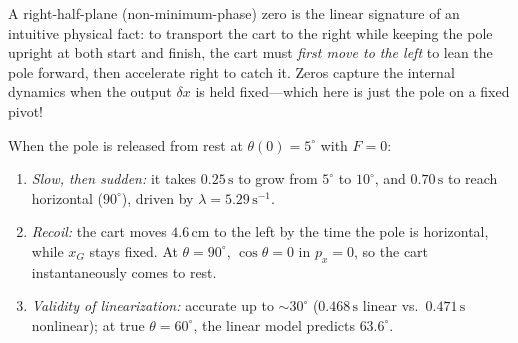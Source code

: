 \documentclass[11pt, a4paper]{article}
\theoremstyle{definition}
\theoremstyle{plain}
\begin{document}
\begin{intuition}
A right-half-plane (non-minimum-phase) zero is the linear signature of an intuitive physical fact: to transport the cart to the right while keeping the pole upright at both start and finish, the cart must \emph{first move to the left} to lean the pole forward, then accelerate right to catch it. Zeros capture the internal dynamics when the output $\delta x$ is held fixed---which here is just the pole on a fixed pivot!
\end{intuition}

When the pole is released from rest at $\theta(0) = 5^\circ$ with $F = 0$:
\begin{enumerate}[label=\arabic*.]
  \item \emph{Slow, then sudden:} it takes $0.25\,\mathrm{s}$ to grow from $5^\circ$ to $10^\circ$, and $0.70\,\mathrm{s}$ to reach horizontal ($90^\circ$), driven by $\lambda = 5.29\,\mathrm{s}^{-1}$.
  \item \emph{Recoil:} the cart moves $4.6\,\mathrm{cm}$ to the left by the time the pole is horizontal, while $x_G$ stays fixed. At $\theta = 90^\circ$, $\cos\theta = 0$ in $p_x = 0$, so the cart instantaneously comes to rest.
  \item \emph{Validity of linearization:} accurate up to $\sim 30^\circ$ ($0.468\,\mathrm{s}$ linear vs.\ $0.471\,\mathrm{s}$ nonlinear); at true $\theta = 60^\circ$, the linear model predicts $63.6^\circ$.
\end{enumerate}
\end{document}
